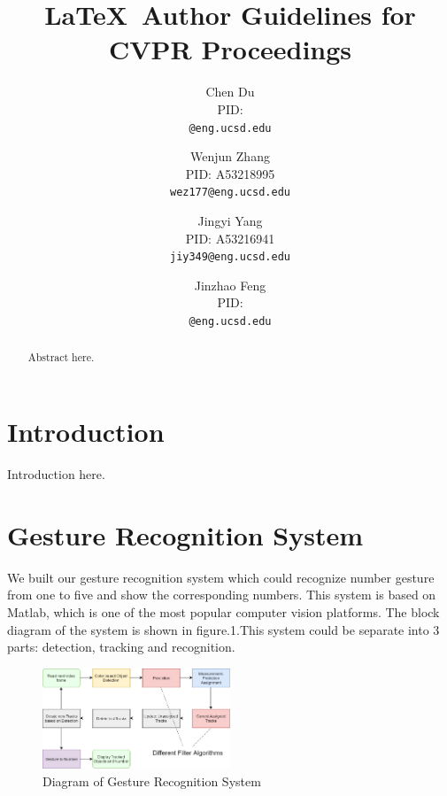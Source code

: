 \documentclass[10pt,twocolumn,letterpaper]{article}
\begin{document}
\title{\LaTeX\ Author Guidelines for CVPR Proceedings}

\author{Chen Du\\
PID: \\
{\tt\small @eng.ucsd.edu}
\and
Wenjun Zhang\\
PID: A53218995\\
{\tt\small wez177@eng.ucsd.edu}
\and
Jingyi Yang\\
PID: A53216941\\
{\tt\small jiy349@eng.ucsd.edu}
\and
Jinzhao Feng\\
PID: \\
{\tt\small @eng.ucsd.edu}
}

\maketitle

\begin{abstract}
   Abstract here.
\end{abstract}

\section{Introduction}

Introduction here.

\section{Gesture Recognition System}

We built our gesture recognition system which could recognize number gesture from one to five and show the corresponding numbers. This system is based on Matlab, which is one of the most popular computer vision platforms. The block diagram of the system is shown in figure.1.This system could be separate into 3 parts: detection, tracking and recognition.

\begin{figure}
     \centering
       \includegraphics[width=0.5\textwidth]{duchen_1.png}
         \caption{\small{Diagram of Gesture Recognition System}}
 \end{figure}
\end{document}
